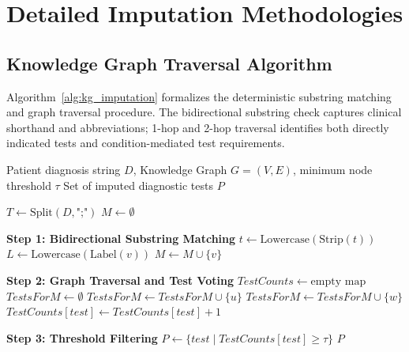 \section{Detailed Imputation Methodologies}

\subsection*{Knowledge Graph Traversal Algorithm}
\label{app:kg_matching}

Algorithm~\ref{alg:kg_imputation} formalizes the deterministic substring
matching and graph traversal procedure. The bidirectional substring check
captures clinical shorthand and abbreviations; 1-hop and 2-hop traversal
identifies both directly indicated tests and condition-mediated test
requirements.

\begin{algorithm}[htbp]
\caption{Knowledge Graph Entity Matching and Test Imputation}
\label{alg:kg_imputation}
\begin{algorithmic}[1]
\Require Patient diagnosis string $D$, Knowledge Graph $G=(V, E)$, minimum node threshold $\tau$
\Ensure Set of imputed diagnostic tests $P$

\State $T \gets \text{Split}(D, \texttt{";"})$ 
\State $M \gets \emptyset$ 

\State \textbf{Step 1: Bidirectional Substring Matching}
    \State $t \gets \text{Lowercase}(\text{Strip}(t))$
        \State $L \gets \text{Lowercase}(\text{Label}(v))$
            \State $M \gets M \cup \{v\}$
        \EndIf
    \EndFor
\EndFor

\State \textbf{Step 2: Graph Traversal and Test Voting}
\State $\mathit{TestCounts} \gets \text{empty map}$ 
    \State $\mathit{TestsForM} \gets \emptyset$
            \State $\mathit{TestsForM} \gets \mathit{TestsForM} \cup \{u\}$ 
                    \State $\mathit{TestsForM} \gets \mathit{TestsForM} \cup \{w\}$ 
                \EndIf
            \EndFor
        \EndIf
    \EndFor
        \State $\mathit{TestCounts}[test] \gets \mathit{TestCounts}[test] + 1$
    \EndFor
\EndFor

\State \textbf{Step 3: Threshold Filtering}
\State $P \gets \{test \mid \mathit{TestCounts}[test] \geq \tau\}$
\State \Return $P$
\end{algorithmic}
\end{algorithm}

